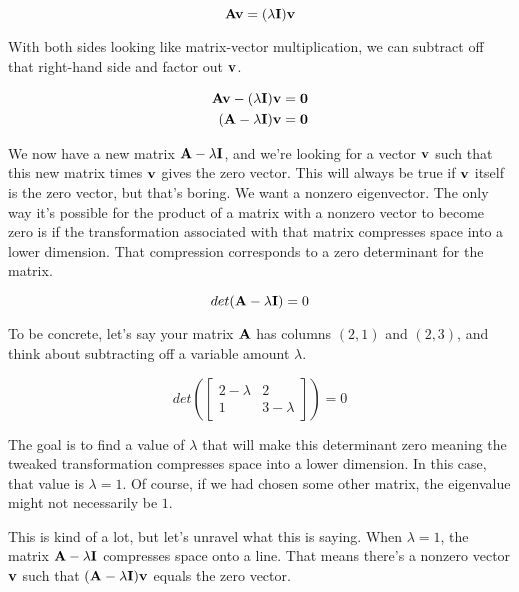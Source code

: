 \begin{equation*}
  \mathbf{A}\mathbf{v} = (\lambda\mathbf{I}) \mathbf{v}
\end{equation*}

With both sides looking like matrix-vector multiplication, we can subtract off
that right-hand side and factor out $\mathbf{v}$.

\begin{align*}
  \mathbf{A}\mathbf{v} - (\lambda\mathbf{I}) \mathbf{v} &= \mathbf{0} \\
  (\mathbf{A} - \lambda\mathbf{I})\mathbf{v} &= \mathbf{0}
\end{align*}

We now have a new matrix $\mathbf{A} - \lambda\mathbf{I}$, and we're looking for a
vector $\mathbf{v}$ such that this new matrix times $\mathbf{v}$ gives the zero
vector. This will always be true if $\mathbf{v}$ itself is the zero vector, but
that's boring. We want a nonzero eigenvector. The only way it's possible for the
product of a matrix with a nonzero vector to become zero is if the
transformation associated with that matrix compresses space into a lower
dimension. That compression corresponds to a zero determinant for the matrix.

\begin{equation*}
  det(\mathbf{A} - \lambda\mathbf{I}) = 0
\end{equation*}

To be concrete, let's say your matrix $\mathbf{A}$ has columns $(2, 1)$ and
$(2, 3)$, and think about subtracting off a variable amount $\lambda$.

\begin{equation*}
  det\left(\begin{bmatrix}
    2 - \lambda & 2 \\
    1 & 3 - \lambda
  \end{bmatrix}\right) = 0
\end{equation*}

The goal is to find a value of $\lambda$ that will make this determinant zero
meaning the tweaked transformation compresses space into a lower dimension. In
this case, that value is $\lambda = 1$. Of course, if we had chosen some other
matrix, the eigenvalue might not necessarily be $1$.

This is kind of a lot, but let's unravel what this is saying. When
$\lambda = 1$, the matrix $\mathbf{A} - \lambda\mathbf{I}$ compresses space onto a
line. That means there's a nonzero vector $\mathbf{v}$ such that
$(\mathbf{A} - \lambda\mathbf{I})\mathbf{v}$ equals the zero vector.

